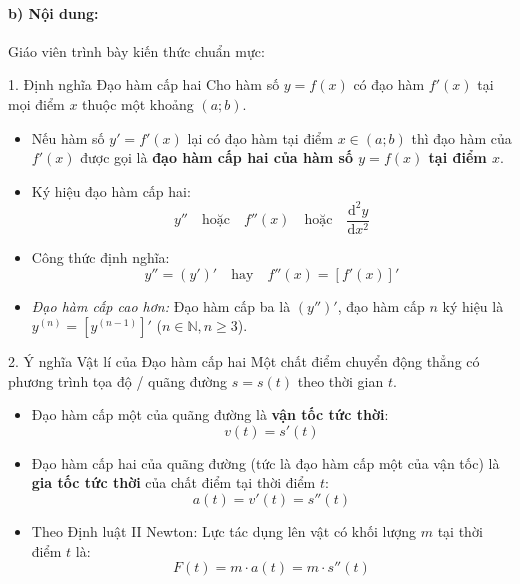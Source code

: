 \documentclass[12pt, a4paper]{article}
\begin{document}
\paragraph{b) Nội dung:} Giáo viên trình bày kiến thức chuẩn mực:

\begin{pedabox}{1. Định nghĩa Đạo hàm cấp hai}
Cho hàm số $y = f(x)$ có đạo hàm $f'(x)$ tại mọi điểm $x$ thuộc một khoảng $(a; b)$.
\begin{itemize}[leftmargin=0.5cm]
    \item Nếu hàm số $y' = f'(x)$ lại có đạo hàm tại điểm $x \in (a; b)$ thì đạo hàm của $f'(x)$ được gọi là \textbf{đạo hàm cấp hai của hàm số $y = f(x)$ tại điểm $x$}.
    \item Ký hiệu đạo hàm cấp hai:
    \begin{equation}
        y'' \quad \text{hoặc} \quad f''(x) \quad \text{hoặc} \quad \dfrac{\mathrm{d}^2 y}{\mathrm{d}x^2}
    \end{equation}
    \item Công thức định nghĩa:
    \begin{equation}
        y'' = (y')' \quad \text{hay} \quad f''(x) = [f'(x)]'
    \end{equation}
    \item \textit{Đạo hàm cấp cao hơn:} Đạo hàm cấp ba là $(y'')'$, đạo hàm cấp $n$ ký hiệu là $y^{(n)} = [y^{(n-1)}]'$ ($n \in \mathbb{N}, n \geq 3$).
\end{itemize}
\end{pedabox}

\begin{pedabox}{2. Ý nghĩa Vật lí của Đạo hàm cấp hai}
Một chất điểm chuyển động thẳng có phương trình tọa độ / quãng đường $s = s(t)$ theo thời gian $t$.
\begin{itemize}[leftmargin=0.5cm]
    \item Đạo hàm cấp một của quãng đường là \textbf{vận tốc tức thời}:
    \begin{equation}
        v(t) = s'(t)
    \end{equation}
    \item Đạo hàm cấp hai của quãng đường (tức là đạo hàm cấp một của vận tốc) là \textbf{gia tốc tức thời} của chất điểm tại thời điểm $t$:
    \begin{equation}
        a(t) = v'(t) = s''(t)
    \end{equation}
    \item Theo Định luật II Newton: Lực tác dụng lên vật có khối lượng $m$ tại thời điểm $t$ là:
    \begin{equation}
        F(t) = m \cdot a(t) = m \cdot s''(t)
    \end{equation}
\end{itemize}
\end{pedabox}
\end{document}
